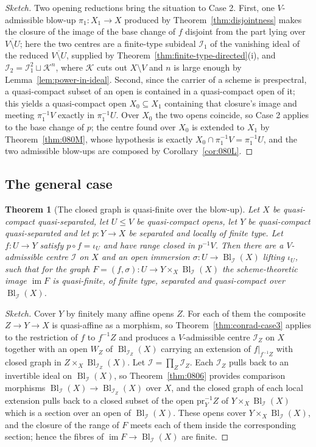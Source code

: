 \documentclass[11pt,a4paper]{article}
\theoremstyle{plain}
\newtheorem{theorem}{Theorem}[section]
\theoremstyle{definition}
\theoremstyle{remark}
\newcommand{\Bl}{\operatorname{Bl}}
\newcommand{\sI}{\mathcal{I}}
\newcommand{\sK}{\mathcal{K}}
\newcommand{\im}{\operatorname{im}}
\newcommand{\qcqs}{quasi-compact quasi-separated}
\begin{document}
\begin{proof}[Sketch]
Two opening reductions bring the situation to Case 2. First, one
$V$-admissible blow-up $\pi_1\colon X_1\to X$ produced by
Theorem~\ref{thm:disjointness} makes the closure of the image of the base
change of $f$ disjoint from the part lying over
$\overline{V\setminus U}$; here the two centres are a finite-type subideal
$\sI_1$ of the vanishing ideal of the reduced $\overline{V\setminus U}$,
supplied by Theorem~\ref{thm:finite-type-directed}(i), and
$\sI_2=\sI_1^{2}\sqcup\sK^{n}$, where $\sK$ cuts out $X\setminus V$ and $n$ is
large enough by Lemma~\ref{lem:power-in-ideal}. Second, since the carrier of a
scheme is prespectral, a quasi-compact subset of an open is contained in a
quasi-compact open of it; this yields a quasi-compact open $X_0\subseteq X_1$
containing that closure's image and meeting $\pi_1^{-1}V$ exactly in
$\pi_1^{-1}U$. Over $X_0$ the two opens coincide, so Case 2 applies to the base
change of $p$; the centre found over $X_0$ is extended to $X_1$ by
Theorem~\ref{thm:080M}, whose hypothesis is exactly
$X_0\cap\pi_1^{-1}V=\pi_1^{-1}U$, and the two admissible blow-ups are composed
by Corollary~\ref{cor:080L}.
\end{proof}

\subsection{The general case}

\begin{theorem}[The closed graph is quasi-finite over the blow-up]
\label{thm:graph-quasi-finite}
Let $X$ be \qcqs{}, let $U\le V$ be quasi-compact opens, let $Y$ be \qcqs{} and
let $p\colon Y\to X$ be separated and locally of finite type. Let $f\colon U\to
Y$ satisfy $p\circ f=\iota_U$ and have range closed in $p^{-1}V$. Then there
are a $V$-admissible centre $\sI$ on $X$ and an open immersion
$\sigma\colon U\to\Bl_\sI(X)$ lifting $\iota_U$, such that for the graph
$F=(f,\sigma)\colon U\to Y\times_X\Bl_\sI(X)$ the scheme-theoretic image
$\im F$ is quasi-finite, of finite type, separated and quasi-compact over
$\Bl_\sI(X)$.
\end{theorem}

\begin{proof}[Sketch]
Cover $Y$ by finitely many affine opens $Z$. For each of them the composite
$Z\to Y\to X$ is quasi-affine as a morphism, so Theorem~\ref{thm:conrad-case3}
applies to the restriction of $f$ to $f^{-1}Z$ and produces a $V$-admissible
centre $\sI_Z$ on $X$ together with an open $W_Z$ of $\Bl_{\sI_Z}(X)$ carrying
an extension of $f|_{f^{-1}Z}$ with closed graph in
$Z\times_X\Bl_{\sI_Z}(X)$. Let $\sI=\prod_Z\sI_Z$. Each $\sI_Z$ pulls back to
an invertible ideal on $\Bl_\sI(X)$, so Theorem~\ref{thm:0806} provides
comparison morphisms $\Bl_\sI(X)\to\Bl_{\sI_Z}(X)$ over $X$, and the closed
graph of each local extension pulls back to a closed subset of the open
$\mathrm{pr}_Y^{-1}Z$ of $Y\times_X\Bl_\sI(X)$ which is a section over an open
of $\Bl_\sI(X)$. These opens cover $Y\times_X\Bl_\sI(X)$, and the closure of
the range of $F$ meets each of them inside the corresponding section; hence the
fibres of $\im F\to\Bl_\sI(X)$ are finite.
\end{proof}
\end{document}
